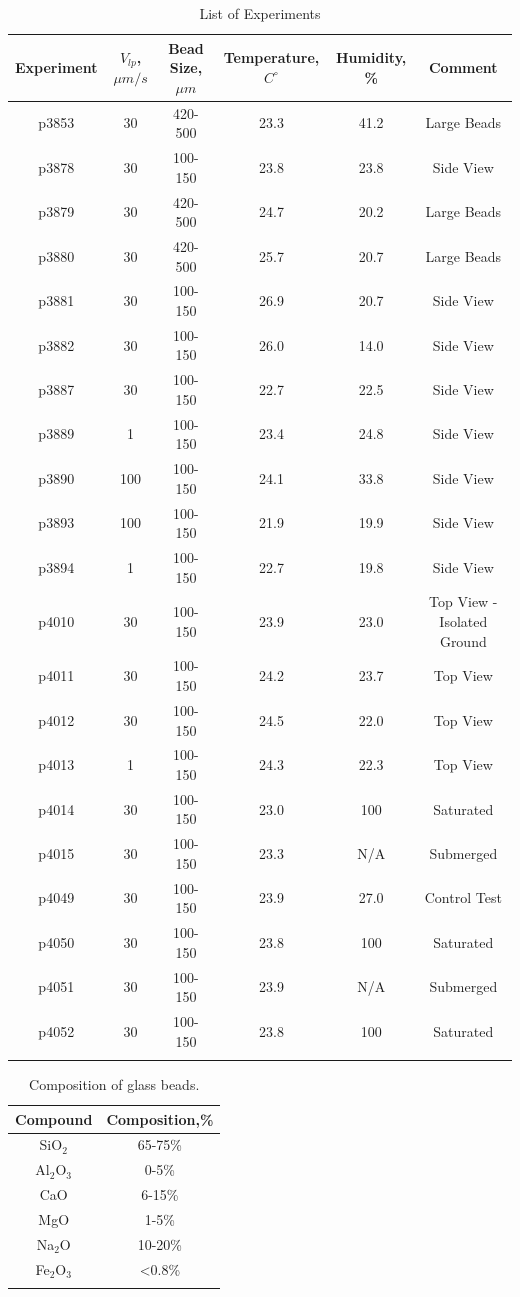 \begin{table}
\caption{List of Experiments}
\centering
\begin{tabular}{c c c c c c}
\hline
 Experiment & $V_{lp}$, $\mu m/s$ & Bead Size, $\mu m$ & Temperature, $C^\circ$& Humidity, \%& Comment \\
\hline
p3853 & 30   & 420-500 & 23.3 & 41.2 & Large Beads\\
p3878 & 30   & 100-150 & 23.8 & 23.8 & Side View\\
p3879 & 30   & 420-500 & 24.7 & 20.2 & Large Beads\\
p3880 & 30   & 420-500 & 25.7 & 20.7 & Large Beads\\
p3881 & 30   & 100-150 & 26.9 & 20.7 & Side View\\
p3882 & 30   & 100-150 & 26.0 & 14.0 & Side View\\
p3887 & 30   & 100-150 & 22.7 & 22.5 & Side View\\
p3889 & 1     & 100-150 & 23.4 & 24.8 & Side View\\
p3890 & 100 & 100-150 & 24.1 & 33.8 & Side View\\
p3893 & 100 & 100-150 & 21.9 & 19.9 & Side View\\
p3894 & 1     & 100-150 & 22.7 & 19.8 & Side View\\
p4010 & 30   & 100-150 & 23.9 & 23.0 & Top View - Isolated Ground\\
p4011 & 30   & 100-150 & 24.2 & 23.7 & Top View\\
p4012 & 30   & 100-150 & 24.5 & 22.0 & Top View\\
p4013 & 1     & 100-150 & 24.3 & 22.3 & Top View\\
p4014 & 30   & 100-150 & 23.0 & 100  & Saturated\\
p4015 & 30   & 100-150 & 23.3 & N/A  & Submerged\\
p4049 & 30   & 100-150 & 23.9 & 27.0 & Control Test \\
p4050 & 30   & 100-150 & 23.8 & 100  & Saturated \\
p4051 & 30   & 100-150 & 23.9 & N/A  & Submerged \\
p4052 & 30   & 100-150 & 23.8 & 100  & Saturated \\
\hline
\label{exp_list}
\end{tabular}
\end{table}


\begin{table}
\caption{Composition of glass beads.}
\centering
\begin{tabular}{c c}
\hline
Compound & Composition,\%\\
\hline
SiO$_2$ & 65-75\% \\
Al$_2$O$_3$ & 0-5\%\\
CaO & 6-15\% \\
MgO & 1-5\%\\
Na$_2$O & 10-20\%\\
Fe$_2$O$_3$ & \textless 0.8\%\\
\hline
\label{bead_composition}
\end{tabular}
\end{table}
